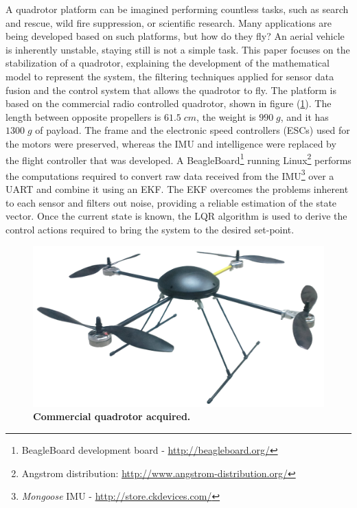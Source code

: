 \documentclass[conference]{IEEEtran}
\newcommand{\refp}[1]{(\ref{#1})}
\begin{document}
A quadrotor platform can be imagined performing countless tasks, such as search and rescue, wild fire suppression, or scientific research\cite{bib:apps}. Many applications are being developed based on such platforms, but how do they fly? An aerial vehicle is inherently unstable, staying still is not a simple task. This paper focuses on the stabilization of a quadrotor, explaining the development of the mathematical model \cite{bib:quadrotor-bible}\cite{bib:curso_quad} to represent the system, the filtering techniques applied for sensor data fusion\cite{bib:kalman}\cite{bib:kalman2} and the control system\cite{bib:quadrotor-bible}\cite{bib:lqrnotes} that allows the quadrotor to fly.
The platform is based on the commercial radio controlled quadrotor, shown in figure \refp{fig:commercial_quadrotor}. The length between opposite propellers is $61.5\;cm$, the weight is $990\;g$, and it has $1300\;g$ of payload. The frame and the electronic speed controllers (ESCs) used for the motors were preserved, whereas the IMU and intelligence were replaced by the flight controller that was developed. A BeagleBoard\footnote{BeagleBoard development board - \url{http://beagleboard.org/}} running Linux\footnote{Angstrom distribution: \url{http://www.angstrom-distribution.org/}} performs the computations required to convert raw data received from the IMU\footnote{\textit{Mongoose} IMU - \url{http://store.ckdevices.com/}} over a UART and combine it using an EKF. The EKF overcomes the problems inherent to each sensor and filters out noise, providing a reliable estimation of the state vector. Once the current state is known, the LQR algorithm\cite{bib:lqrnotes}\cite{bib:lqr-discreto} is used to derive the control actions required to bring the system to the desired set-point.
\begin{figure}[h!]
	\centering
	\includegraphics[width=.8\columnwidth]{./pics_paper/javi.png}
	\caption{\textbf{Commercial quadrotor acquired.}}
	\label{fig:commercial_quadrotor}
\end{figure}
\end{document}
